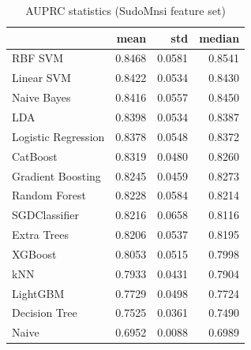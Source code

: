 \begin{table}
\caption{AUPRC statistics (SudoMnsi feature set)}
\label{tab:auprc_SudoMnsi_stats}
\begin{tabular}{lrrr}
\toprule
 & mean & std & median \\
\midrule
RBF SVM & 0.8468 & 0.0581 & 0.8541 \\
Linear SVM & 0.8422 & 0.0534 & 0.8430 \\
Naive Bayes & 0.8416 & 0.0557 & 0.8450 \\
LDA & 0.8398 & 0.0534 & 0.8387 \\
Logistic Regression & 0.8378 & 0.0548 & 0.8372 \\
CatBoost & 0.8319 & 0.0480 & 0.8260 \\
Gradient Boosting & 0.8245 & 0.0459 & 0.8273 \\
Random Forest & 0.8228 & 0.0584 & 0.8214 \\
SGDClassifier & 0.8216 & 0.0658 & 0.8116 \\
Extra Trees & 0.8206 & 0.0537 & 0.8195 \\
XGBoost & 0.8053 & 0.0515 & 0.7998 \\
kNN & 0.7933 & 0.0431 & 0.7904 \\
LightGBM & 0.7729 & 0.0498 & 0.7724 \\
Decision Tree & 0.7525 & 0.0361 & 0.7490 \\
Naive & 0.6952 & 0.0088 & 0.6989 \\
\bottomrule
\end{tabular}
\end{table}
